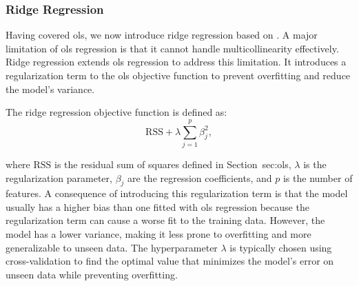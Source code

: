 \subsubsection{Ridge Regression}
Having covered \gls{ols}, we now introduce ridge regression based on \citet{James2023AnIS}.
A major limitation of \gls{ols} regression is that it cannot handle multicollinearity effectively.
Ridge regression extends \gls{ols} regression to address this limitation.
It introduces a regularization term to the \gls{ols} objective function to prevent overfitting and reduce the model's variance.

The ridge regression objective function is defined as:
$$
\text{RSS} + \lambda \sum_{j=1}^{p} \beta_j^2,
$$

where $\text{RSS}$ is the residual sum of squares defined in Section~{sec:ols}, $\lambda$ is the regularization parameter, $\beta_j$ are the regression coefficients, and $p$ is the number of features.
A consequence of introducing this regularization term is that the model usually has a higher bias than one fitted with \gls{ols} regression because the regularization term can cause a worse fit to the training data.
However, the model has a lower variance, making it less prone to overfitting and more generalizable to unseen data.
The hyperparameter $\lambda$ is typically chosen using cross-validation to find the optimal value that minimizes the model's error on unseen data while preventing overfitting.